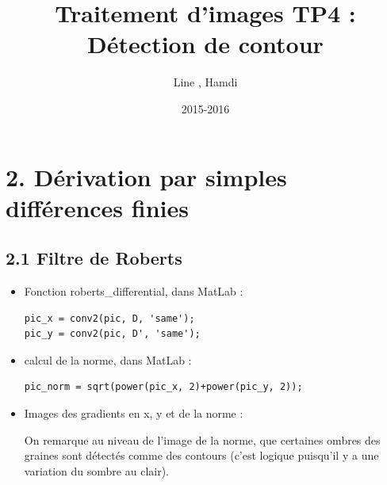 \documentclass{article}
\title{\textbf{Traitement d'images TP4 : Détection de contour}}
\author{Line \bsc{POUVARET}, Hamdi \bsc{BENAOUN}}
\date{2015-2016}
\begin{document}
\maketitle

\section*{2. Dérivation par simples différences finies}
\subsection*{2.1 Filtre de Roberts}
\begin{itemize}\renewcommand{\labelitemi}{$\bullet$}
	\item Fonction roberts\_differential, dans MatLab :
	
\begin{lstlisting}
pic_x = conv2(pic, D, 'same');
pic_y = conv2(pic, D', 'same');
\end{lstlisting}

	\item calcul de la norme, dans MatLab :
\begin{lstlisting}
pic_norm = sqrt(power(pic_x, 2)+power(pic_y, 2));
\end{lstlisting}
	\item Images des gradients en x, y et de la norme :
	

On remarque au niveau de l'image de la norme, que certaines ombres des graines sont détectés comme des contours (c'est logique puisqu'il y a une variation du sombre au clair).

\end{itemize}
\end{document}
